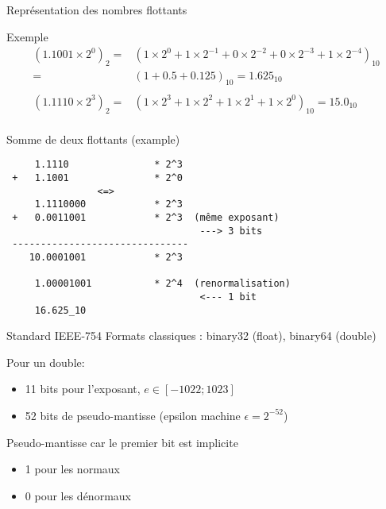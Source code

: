\documentclass{beamer}
\begin{document}
\begin{frame}{Représentation des nombres flottants}
\begin{center}
    \end{center}
    \begin{block}{Exemple}
        \begin{align*}
            (1.1001 \times 2^0)_2 =   & (1 \times 2^0 + 1 \times 2^{-1} + 0 \times 2^{-2} + 0 \times 2^{-3} + 1 \times 2^{-4} )_{10} \\
            =                         & (1 + 0.5 + 0.125)_{10} = 1.625_{10}                                                          \\                                                \\
            (1.1110 \times 2^{3})_2 = & (1 \times 2^{3} + 1 \times 2^{2} + 1 \times 2^{1} + 1 \times 2^0)_{10} = 15.0_{10}           \\
        \end{align*}
    \end{block}
\end{frame}

\begin{frame}[fragile]{Somme de deux flottants (example)}
    \begin{verbatim}
     1.1110               * 2^3
 +   1.1001               * 2^0
                <=>
     1.1110000            * 2^3
 +   0.0011001            * 2^3  (même exposant)
                                  ---> 3 bits
 -------------------------------
    10.0001001            * 2^3

     1.00001001           * 2^4  (renormalisation)
                                  <--- 1 bit
     16.625_10
    \end{verbatim}
\end{frame}

\begin{frame}{Standard IEEE-754}
    Formats classiques : binary32 (float), binary64 (double)

    Pour un double:
    \begin{itemize}
        \item 11 bits pour l'exposant, $e \in [-1022; 1023]$
        \item 52 bits de pseudo-mantisse (epsilon machine $\epsilon = 2^{-52}$)
    \end{itemize}

    Pseudo-mantisse car le premier bit est implicite
    \begin{itemize}
        \item 1 pour les normaux
        \item 0 pour les dénormaux
    \end{itemize}
\end{frame}
\end{document}

